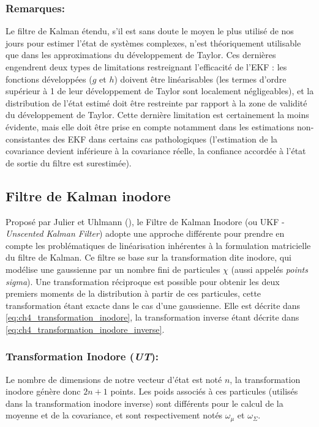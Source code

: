 \subsubsection{Remarques:}
Le filtre de Kalman étendu, s'il est sans doute le moyen le plus utilisé de nos jours pour estimer l'état de systèmes complexes, n'est théoriquement utilisable que dans les approximations du développement de Taylor. Ces dernières engendrent deux types de limitations restreignant l'efficacité de l'EKF : les fonctions développées ($g$ et $h$) doivent être linéarisables (les termes d'ordre supérieur à 1 de leur développement de Taylor sont localement négligeables), et la distribution de l'état estimé doit être restreinte par rapport à la zone de validité du développement de Taylor. Cette dernière limitation est certainement la moins évidente, mais elle doit être prise en compte notamment dans les estimations non-consistantes des EKF dans certains cas pathologiques (l'estimation de la covariance devient inférieure à la covariance réelle, la confiance accordée à l'état de sortie du filtre est surestimée).

\subsection{Filtre de Kalman inodore}
Proposé par Julier et Uhlmann (\cite{Julier1997}), le Filtre de Kalman Inodore (ou UKF - \emph{Unscented Kalman Filter}) adopte une approche différente pour prendre en compte les problématiques de linéarisation inhérentes à la formulation matricielle du filtre de Kalman. Ce filtre se base sur la transformation dite inodore, qui modélise une gaussienne par un nombre fini de particules $\chi$ (aussi appelés \emph{points sigma}). Une transformation réciproque est possible pour obtenir les deux premiers moments de la distribution à partir de ces particules, cette transformation étant exacte dans le cas d'une gaussienne. Elle est décrite dans \ref{eq:ch4_transformation_inodore}, la transformation inverse étant décrite dans \ref{eq:ch4_transformation_inodore_inverse}. 

\subsubsection{Transformation Inodore (\emph{UT}):}
Le nombre de dimensions de notre vecteur d'état est noté $n$, la transformation inodore génère donc $2n+1$ points. Les poids associés à ces particules (utilisés dans la transformation inodore inverse) sont différents pour le calcul de la moyenne et de la covariance, et sont respectivement notés $\omega_\mu$ et $\omega_\Sigma$.

